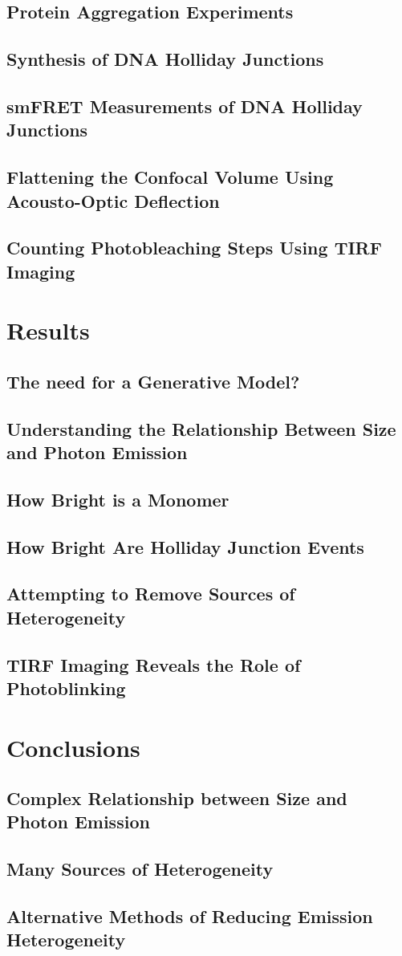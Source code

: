 \subsection{Protein Aggregation Experiments}
\subsection{Synthesis of DNA Holliday Junctions}
\subsection{smFRET Measurements of DNA Holliday Junctions}
\subsection{Flattening the Confocal Volume Using Acousto-Optic Deflection}
\subsection{Counting Photobleaching Steps Using TIRF Imaging}

\section{Results}
\subsection{The need for a Generative Model?}
\subsection{Understanding the Relationship Between Size and Photon Emission}
\subsection{How Bright is a Monomer}
\subsection{How Bright Are Holliday Junction Events}
\subsection{Attempting to Remove Sources of Heterogeneity}
\subsection{TIRF Imaging Reveals the Role of Photoblinking}

\section{Conclusions}
\subsection{Complex Relationship between Size and Photon Emission}
\subsection{Many Sources of Heterogeneity}
\subsection{Alternative Methods of Reducing Emission Heterogeneity}